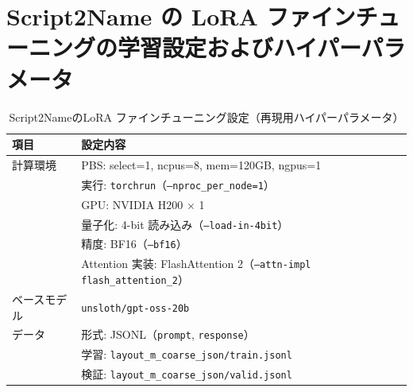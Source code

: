 \documentclass[a4j,12pt,dvipdfmx]{jsreport}
\begin{document}
\section{Script2Name の LoRA ファインチューニングの学習設定およびハイパーパラメータ}

\label{app:script2name_hyperparams}
\begin{table}[htbp]
  \centering
  \small
  \begin{threeparttable}
    \caption{Script2NameのLoRA ファインチューニング設定（再現用ハイパーパラメータ）}
    \label{tab:script2name_hparams}
    \begin{tabular}{ll}
      \toprule
      \textbf{項目} & \textbf{設定内容}                                                                        \\
      \midrule
      計算環境        &
      PBS: select=1, ncpus=8, mem=120GB, ngpus=1                                                         \\
                  &
      実行: \texttt{torchrun}（\texttt{--nproc\_per\_node=1}）                                               \\
                  &
      GPU: NVIDIA H200 $\times$ 1                                                                        \\
                  &
      量子化: 4-bit 読み込み（\texttt{--load-in-4bit}）                                                           \\
                  &
      精度: BF16（\texttt{--bf16}）                                                                          \\
                  &
      Attention 実装: FlashAttention 2（\texttt{--attn-impl flash\_attention\_2}）                           \\
      \midrule
      ベースモデル      &
      \texttt{unsloth/gpt-oss-20b}                                                                       \\
      \midrule
      データ         &
      形式: JSONL（\texttt{prompt}, \texttt{response}）                                                      \\
                  &
      学習: \texttt{layout\_m\_coarse\_json/train.jsonl}                                                   \\
                  &
      検証: \texttt{layout\_m\_coarse\_json/valid.jsonl}                                                   \\
      \midrule

\end{tabular}
\end{threeparttable}
\end{table}
\end{document}
